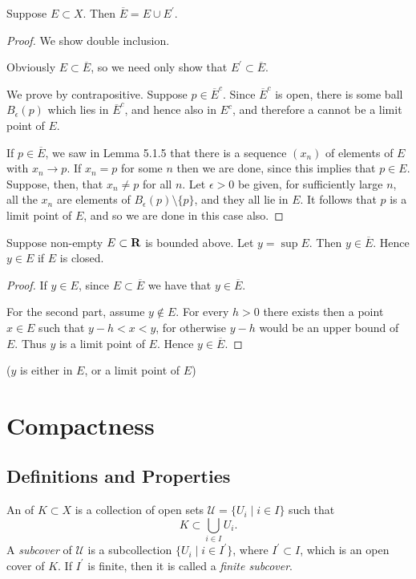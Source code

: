\begin{proposition}
Suppose $E\subset X$. Then $\overline{E}=E\cup E^\prime$.
\end{proposition}

\begin{proof}
We show double inclusion.

 Obviously $E\subset\overline{E}$, so we need only show that $E^\prime\subset\overline{E}$. 

We prove by contrapositive. Suppose $p\in\overline{E}^c$. Since $\overline{E}^c$ is open, there is some ball $B_\epsilon(p)$ which lies in $\overline{E}^c$, and hence also in $E^c$, and therefore a cannot be a limit point of $E$.

 If $p\in\overline{E}$, we saw in Lemma 5.1.5 that there is a sequence  $(x_n)$ of elements of $E$ with $x_n\to p$. If $x_n=p$ for some $n$ then we are done, since this implies that $p\in E$. Suppose, then, that $x_n\neq p$ for all $n$. Let $\epsilon>0$ be given, for sufficiently large $n$, all the $x_n$ are elements of $B_\epsilon(p)\setminus\{p\}$, and they all lie in $E$. It follows that $p$ is a limit point of $E$, and so we are done in this case also.
\end{proof}

\begin{proposition}\label{prop:closure-sup}
Suppose non-empty $E\subset\mathbf R$ is bounded above. Let $y=\sup E$. Then $y\in\overline{E}$. Hence $y\in E$ if $E$ is closed.
\end{proposition}

\begin{proof}
If $y\in E$, since $E\subset\overline{E}$ we have that $y\in\overline{E}$.

For the second part, assume $y\notin E$. For every $h>0$ there exists then a point $x\in E$ such that $y-h<x<y$, for otherwise $y-h$ would be an upper bound of $E$. Thus $y$ is a limit point of $E$. Hence $y\in\overline{E}$.
\end{proof}
($y$ is either in $E$, or a limit point of $E$)
\pagebreak

\section{Compactness}
\subsection{Definitions and Properties}
\begin{definition}
An  of $K\subset X$ is a collection of open sets $\mathcal{U}=\{U_i\mid i\in I\}$ such that
\[K\subset\bigcup_{i\in I}U_i.\]
A \emph{subcover} of $\mathcal{U}$ is a subcollection $\{U_i\mid i\in I^\prime\}$, where $I^\prime\subset I$, which is an open cover of $K$. If $I^\prime$ is finite, then it is called a \emph{finite subcover}.
\end{definition}

